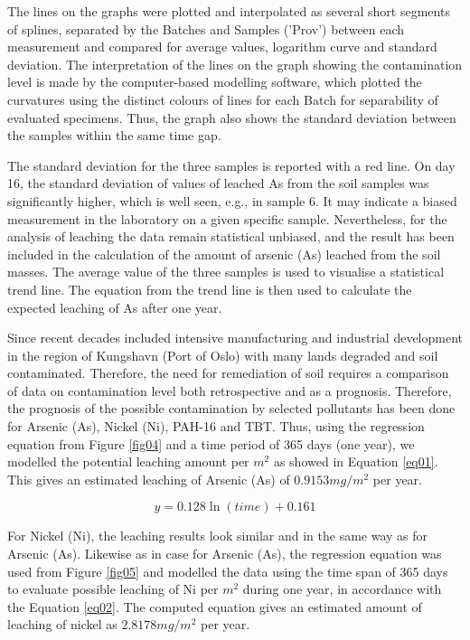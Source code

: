 \documentclass[algorithms,article,submit,pdftex,moreauthors]{Definitions/mdpi}
\begin{document}
The lines on the graphs were plotted and interpolated as several short segments of splines, separated by the Batches and Samples ('Prov') between each measurement and compared for average values, logarithm curve and standard deviation. The interpretation of the lines on the graph showing the contamination level is made by the computer-based modelling software, which plotted the curvatures using the distinct colours of lines for each Batch for separability of evaluated specimens. Thus, the graph also shows the standard deviation between the samples within the same time gap. 

The standard deviation for the three samples is reported with a red line. On day 16, the standard deviation of values of leached As from the soil samples was significantly higher, which is well seen, e.g., in sample 6. It may indicate a biased measurement in the laboratory on a given specific sample. Nevertheless, for the analysis of leaching the data remain statistical unbiased, and the result has been included in the calculation of the amount of arsenic (As) leached from the soil masses. The average value of the three samples is used to visualise a statistical trend line. The equation from the trend line is then used to calculate the expected leaching of As after one year. 

Since recent decades included intensive manufacturing and industrial development in the region of Kungshavn (Port of Oslo) with many lands degraded and soil contaminated. Therefore, the need for remediation of soil requires a comparison of data on contamination level both retrospective and as a prognosis. Therefore, the prognosis of the possible contamination by selected pollutants has been done for Arsenic (As), Nickel (Ni), PAH-16 and TBT. Thus, using the regression equation from Figure \ref{fig04} and a time period of 365 days (one year), we modelled the potential leaching amount per $m^2$ as showed in Equation \ref{eq01}. This gives an estimated leaching of Arsenic (As) of $0.9153 mg/m^2$ per year.

\begin{equation}\label{eq01}
	y= 0.128 \ln(time) + 0.161
\end{equation}

For Nickel (Ni), the leaching results look similar and in the same way as for Arsenic (As). Likewise as in case for Arsenic (As), the regression equation was used from Figure \ref{fig05} and modelled the data using the time span of 365 days to evaluate possible  leaching of Ni per $m^2$ during one year, in accordance with the Equation \ref{eq02}. The computed equation gives an estimated amount of leaching of nickel as $2.8178 mg/m^2$ per year.
\end{document}
